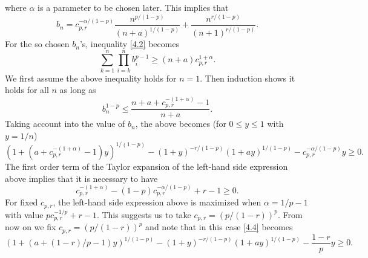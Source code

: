 \documentclass[11pt]{amsart}
\numberwithin{equation}{section}
\theoremstyle{definition}
\theoremstyle{remark}
\begin{document}
  where $\alpha$ is a parameter to be chosen later.
  This implies that
\begin{equation*}
   b_n=c^{-\alpha/(1-p)}_{p,r}\frac {n^{p/(1-p)}}{(n+a)^{1/(1-p)}}+\frac {n^{r/(1-p)}}{(n+1)^{r/(1-p)}}.
\end{equation*}
   For the so chosen $b_n$'s, inequality \eqref{4.2} becomes
\begin{equation}
\label{4.3}
  \sum^n_{k=1}\prod^n_{i=k}b^{p-1}_i  \geq (n+a)c^{1+\alpha}_{p,r}.
\end{equation}
   We first assume the above inequality holds for $n=1$. Then
   induction shows it holds for all $n$ as long as
\begin{equation*}
   b^{1-p}_n  \leq
 \frac {n+a+c^{-(1+\alpha)}_{p,r}-1}{n+a}.
\end{equation*}
  Taking account into the value of $b_n$, the above becomes (for $0 \leq y \leq 1$ with
  $y=1/n$)
\begin{equation}
\label{4.4}
   (1+(a+c^{-(1+\alpha)}_{p,r}-1)y)^{1/(1-p)}-(1+y)^{-r/(1-p)}(1+ay)^{1/(1-p)}- c^{-\alpha/(1-p)}_{p,r}y  \geq 0.
\end{equation}
   The first order term of the Taylor expansion of
   the left-hand side expression above implies that it is necessary to have
\begin{equation*}
    c^{-(1+\alpha)}_{p,r}-(1-p)c^{-\alpha/(1-p)}_{p,r}+r-1 \geq 0.
\end{equation*}
    For fixed $c_{p,r}$, the left-hand side expression above is
    maximized when $\alpha=1/p-1$ with value $pc^{-1/p}_{p,r}+r-1$.
    This suggests us to take $c_{p,r}=(p/(1-r))^p$. From now on we
    fix $c_{p,r}=(p/(1-r))^p$ and note that in this case \eqref{4.4}
    becomes
\begin{equation}
\label{4.5}
   (1+(a+(1-r)/p-1)y)^{1/(1-p)}-(1+y)^{-r/(1-p)}(1+ay)^{1/(1-p)}- \frac {1-r}{p}y  \geq 0.
\end{equation}
\end{document}
